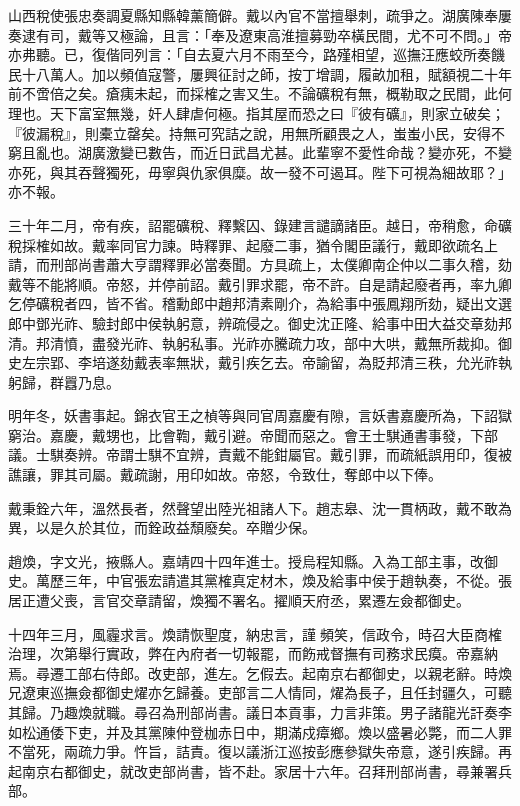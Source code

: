\begin{pinyinscope}
山西稅使張忠奏調夏縣知縣韓薰簡僻。戴以內官不當擅舉刺，疏爭之。湖廣陳奉屢奏逮有司，戴等又極論，且言：「奉及遼東高淮擅募勁卒橫民間，尤不可不問。」帝亦弗聽。已，復偕同列言：「自去夏六月不雨至今，路殣相望，巡撫汪應蛟所奏饑民十八萬人。加以頻值寇警，屢興征討之師，按丁增調，履畝加租，賦額視二十年前不啻倍之矣。瘡痍未起，而採榷之害又生。不論礦稅有無，概勒取之民間，此何理也。天下富室無幾，奸人肆虐何極。指其屋而恐之曰『彼有礦』，則家立破矣；『彼漏稅』，則橐立罄矣。持無可究詰之說，用無所顧畏之人，蚩蚩小民，安得不窮且亂也。湖廣激變已數告，而近日武昌尤甚。此輩寧不愛性命哉？變亦死，不變亦死，與其吞聲獨死，毋寧與仇家俱糜。故一發不可遏耳。陛下可視為細故耶？」亦不報。

三十年二月，帝有疾，詔罷礦稅、釋繫囚、錄建言譴謫諸臣。越日，帝稍愈，命礦稅採榷如故。戴率同官力諫。時釋罪、起廢二事，猶令閣臣議行，戴即欲疏名上請，而刑部尚書蕭大亨謂釋罪必當奏聞。方具疏上，太僕卿南企仲以二事久稽，劾戴等不能將順。帝怒，并停前詔。戴引罪求罷，帝不許。自是請起廢者再，率九卿乞停礦稅者四，皆不省。稽勳郎中趙邦清素剛介，為給事中張鳳翔所劾，疑出文選郎中鄧光祚、驗封郎中侯執躬意，辨疏侵之。御史沈正隆、給事中田大益交章劾邦清。邦清憤，盡發光祚、執躬私事。光祚亦騰疏力攻，部中大哄，戴無所裁抑。御史左宗郢、李培遂劾戴表率無狀，戴引疾乞去。帝諭留，為貶邦清三秩，允光祚執躬歸，群囂乃息。

明年冬，妖書事起。錦衣官王之楨等與同官周嘉慶有隙，言妖書嘉慶所為，下詔獄窮治。嘉慶，戴甥也，比會鞫，戴引避。帝聞而惡之。會王士騏通書事發，下部議。士騏奏辨。帝謂士騏不宜辨，責戴不能鉗屬官。戴引罪，而疏紙誤用印，復被譙讓，罪其司屬。戴疏謝，用印如故。帝怒，令致仕，奪郎中以下俸。

戴秉銓六年，溫然長者，然聲望出陸光祖諸人下。趙志皋、沈一貫柄政，戴不敢為異，以是久於其位，而銓政益頹廢矣。卒贈少保。

趙煥，字文光，掖縣人。嘉靖四十四年進士。授烏程知縣。入為工部主事，改御史。萬歷三年，中官張宏請遣其黨榷真定材木，煥及給事中侯于趙執奏，不從。張居正遭父喪，言官交章請留，煥獨不署名。擢順天府丞，累遷左僉都御史。

十四年三月，風霾求言。煥請恢聖度，納忠言，謹頻笑，信政令，時召大臣商榷治理，次第舉行實政，弊在內府者一切報罷，而飭戒督撫有司務求民瘼。帝嘉納焉。尋遷工部右侍郎。改吏部，進左。乞假去。起南京右都御史，以親老辭。時煥兄遼東巡撫僉都御史燿亦乞歸養。吏部言二人情同，燿為長子，且任封疆久，可聽其歸。乃趣煥就職。尋召為刑部尚書。議日本貢事，力言非策。男子諸龍光訐奏李如松通倭下吏，并及其黨陳仲登枷赤日中，期滿戍瘴鄉。煥以盛暑必斃，而二人罪不當死，兩疏力爭。忤旨，詰責。復以議浙江巡按彭應參獄失帝意，遂引疾歸。再起南京右都御史，就改吏部尚書，皆不赴。家居十六年。召拜刑部尚書，尋兼署兵部。


\end{pinyinscope}
